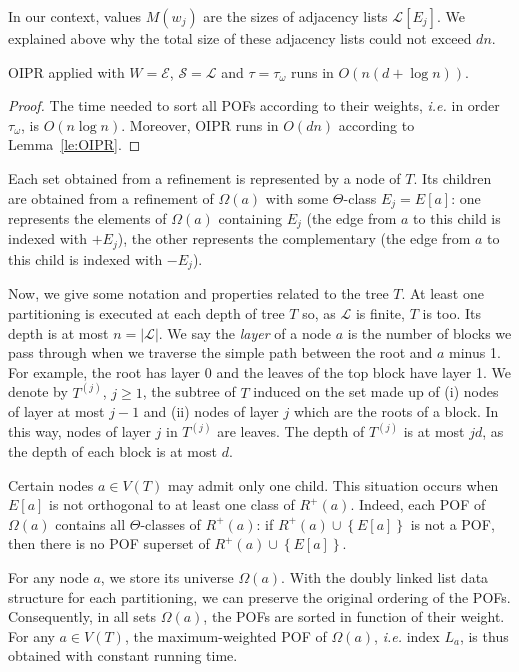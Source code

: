\documentclass[a4paper,UKenglish,numberwithinsect,cleveref, autoref,anonymous]{lipics-v2021}
\newcommand{\set}[1]{\left\{ #1 \right\}}
\newcommand{\card}[1]{\left| #1 \right|}
\begin{document}
In our context, values $M(w_j)$ are the sizes of adjacency lists $\mathcal{L}\left[E_j\right]$. We explained above why the total size of these adjacency lists could not exceed $dn$.

\begin{corollary} OIPR applied with $W = \mathcal{E}$, $\mathcal{S} = \mathcal{L}$ and $\tau = \tau_{\omega}$ runs in $O(n(d+\log n))$.
\label{co:oipr}
\end{corollary}
\begin{proof}
The time needed to sort all POFs according to their weights, {\em i.e.} in order $\tau_{\omega}$, is $O(n\log n)$. Moreover, OIPR runs in $O(dn)$  according to Lemma~\ref{le:OIPR}.
\end{proof}

Each set obtained from a refinement is represented by a node of $T$. Its children are obtained from a refinement of $\Omega(a)$ with some $\Theta$-class $E_j=E\left[a\right]$: one represents the elements of $\Omega(a)$ containing $E_j$ (the edge from $a$ to this child is indexed with $+E_j$), the other represents the complementary (the edge from $a$ to this child is indexed with $-E_j$).

Now, we give some notation and properties related to the tree $T$. At least one partitioning is executed at each depth of tree $T$ so, as $\mathcal{L}$ is finite, $T$ is too. Its depth is at most $n = \card{\mathcal{L}}$. 
We say the \textit{layer} of a node $a$ is the number of blocks we pass through when we traverse the simple path between the root and $a$ minus 1. For example, the root has layer 0 and the leaves of the top block have layer 1. We denote by $T^{(j)}$, $j\ge 1$, the subtree of $T$ induced on the set made up of (i) nodes of layer at most $j-1$ and (ii) nodes of layer $j$ which are the roots of a block. In this way, nodes of layer $j$ in $T^{(j)}$ are leaves. The depth of $T^{(j)}$ is at most $jd$, as the depth of each block is at most $d$. 

Certain nodes $a \in V(T)$ may admit only one child. This situation occurs when $E\left[a\right]$ is not orthogonal to at least one class of $R^+(a)$. Indeed, each POF of $\Omega(a)$ contains all $\Theta$-classes of $R^+(a)$: if $R^+(a) \cup \set{E\left[a\right]}$ is not a POF, then there is no POF superset of $R^+(a) \cup \set{E\left[a\right]}$. 

For any node $a$, we store its universe $\Omega(a)$. With the doubly linked list data structure for each partitioning, we can preserve the original ordering of the POFs. Consequently, in all sets $\Omega(a)$, the POFs are sorted in function of their weight. For any $a \in V(T)$, the maximum-weighted POF of $\Omega(a)$, {\em i.e.} index $L_a$, is thus obtained with constant running time.
\end{document}
